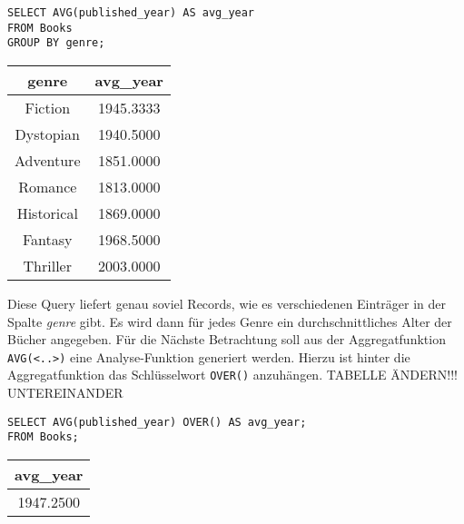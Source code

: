 \begin{minipage}{0.68\textwidth}
	 \begin{lstlisting}
SELECT AVG(published_year) AS avg_year
FROM Books
GROUP BY genre;
	\end{lstlisting}
\end{minipage}
\hfill
\begin{minipage}{0.28\textwidth}
	\centering
	\begin{tabular}{|c|c|}
		\hline
		\textbf{genre} & \textbf{avg\_year} \\
		\hline
		Fiction        & 1945.3333          \\
		\hline
		Dystopian      & 1940.5000          \\
		\hline
		Adventure      & 1851.0000          \\
		\hline
		Romance        & 1813.0000          \\
		\hline
		Historical     & 1869.0000          \\
		\hline
		Fantasy        & 1968.5000          \\
		\hline
		Thriller       & 2003.0000          \\
		\hline
	\end{tabular}
	 \label{tab:avg_year_genre}
\end{minipage}

Diese Query liefert genau soviel Records, wie es verschiedenen Einträger in der
Spalte \textit{genre} gibt. Es wird dann für jedes Genre ein durchschnittliches
Alter der Bücher angegeben. Für die Nächste Betrachtung soll aus der Aggregatfunktion
\texttt{AVG(<..>)} eine Analyse-Funktion generiert werden. Hierzu ist hinter die
Aggregatfunktion das Schlüsselwort \texttt{OVER()} anzuhängen. TABELLE ÄNDERN!!!
UNTEREINANDER

\begin{minipage}{0.68\textwidth}
	 \begin{lstlisting}
SELECT AVG(published_year) OVER() AS avg_year;
FROM Books;
	\end{lstlisting}
\end{minipage}
\hfill
\begin{minipage}{0.28\textwidth}
	\centering
	\begin{tabular}{|c|}
		\hline
		avg\_year \\
		\hline
		1947.2500 \\
		\hline
	\end{tabular}
	 \label{tab:avg_year_over}
\end{minipage}

